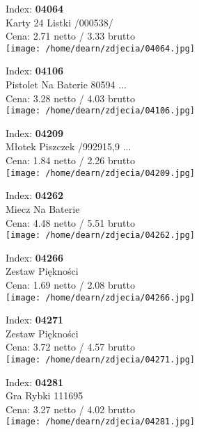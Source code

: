 {Index: \textbf{04064}\\
Karty 24 Listki  /000538/\\
Cena: 2.71 netto / 3.33 brutto\\
  \texttt{[image: /home/dearn/zdjecia/04064.jpg]}}\newline\newline

{Index: \textbf{04106}\\
Pistolet Na Baterie 80594 ...\\
Cena: 3.28 netto / 4.03 brutto\\
  \texttt{[image: /home/dearn/zdjecia/04106.jpg]}}\newline\newline

{Index: \textbf{04209}\\
Młotek Piszczek /992915,9 ...\\
Cena: 1.84 netto / 2.26 brutto\\
  \texttt{[image: /home/dearn/zdjecia/04209.jpg]}}\newline\newline

{Index: \textbf{04262}\\
Miecz Na Baterie\\
Cena: 4.48 netto / 5.51 brutto\\
  \texttt{[image: /home/dearn/zdjecia/04262.jpg]}}\newline\newline

{Index: \textbf{04266}\\
Zestaw Piękności\\
Cena: 1.69 netto / 2.08 brutto\\
  \texttt{[image: /home/dearn/zdjecia/04266.jpg]}}\newline\newline

{Index: \textbf{04271}\\
Zestaw Piękności\\
Cena: 3.72 netto / 4.57 brutto\\
  \texttt{[image: /home/dearn/zdjecia/04271.jpg]}}\newline\newline

{Index: \textbf{04281}\\
Gra Rybki  111695\\
Cena: 3.27 netto / 4.02 brutto\\
  \texttt{[image: /home/dearn/zdjecia/04281.jpg]}}\newline\newline

